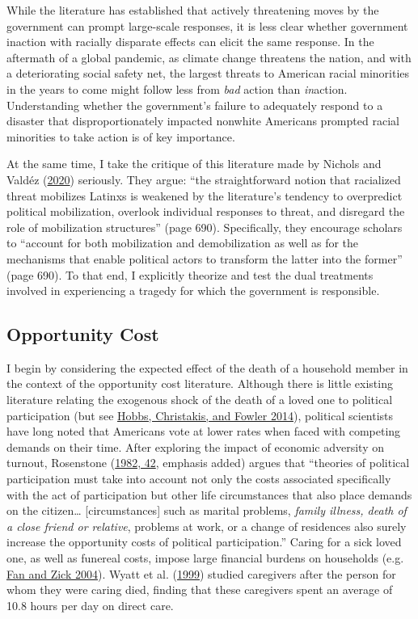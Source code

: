 \documentclass[
  12pt,
]{article}
\begin{document}
While the literature has established that actively threatening moves by the government can prompt large-scale responses, it is less clear whether government inaction with racially disparate effects can elicit the same response. In the aftermath of a global pandemic, as climate change threatens the nation, and with a deteriorating social safety net, the largest threats to American racial minorities in the years to come might follow less from \emph{bad} action than \emph{in}action. Understanding whether the
government's failure to adequately respond to a disaster that disproportionately impacted nonwhite Americans prompted racial minorities to take action is of key importance.

At the same time, I take the critique of this literature made by Nichols and Valdéz (\protect\hyperlink{ref-Nichols2020a}{2020}) seriously. They argue: ``the straightforward notion that racialized threat mobilizes Latinxs is weakened by the literature's tendency to overpredict political mobilization, overlook individual responses to threat, and disregard the role of mobilization structures'' (page 690). Specifically, they encourage scholars to ``account for both mobilization and demobilization as well as for the mechanisms that enable political actors to transform the latter into the former'' (page 690). To that end, I explicitly theorize and test the dual treatments involved in experiencing a tragedy for which the government is responsible.

\hypertarget{opportunity-cost}{%
\subsection*{Opportunity Cost}\label{opportunity-cost}}

I begin by considering the expected effect of the death of a household member in the context of the opportunity cost literature. Although there is little existing literature relating the exogenous shock of the death of a loved one to political participation (but see \protect\hyperlink{ref-Hobbs2014}{Hobbs, Christakis, and Fowler 2014}), political scientists have long noted that Americans vote at lower rates when faced with competing demands on their time. After exploring the impact of economic adversity on turnout, Rosenstone (\protect\hyperlink{ref-Rosenstone1982}{1982, 42}, emphasis added) argues that ``theories of political participation must take into account not only the costs associated specifically with the act of participation but other life circumstances that also place demands on the citizen\ldots{} {[}circumstances{]} such as marital problems, \emph{family illness, death of a close friend or relative}, problems at work, or a change of residences also surely increase the opportunity costs of political participation.'' Caring for a sick loved one, as well as funereal costs, impose large financial burdens on households (e.g. \protect\hyperlink{ref-Fan2004}{Fan and Zick 2004}). Wyatt et al. (\protect\hyperlink{ref-Wyatt1999}{1999}) studied caregivers after the person for whom they were caring died, finding that these caregivers spent an average of 10.8 hours per day on direct care.
\end{document}
